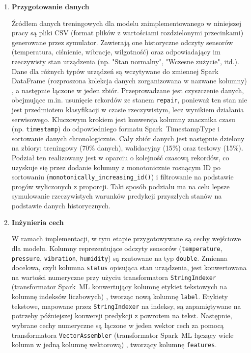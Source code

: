 \begin{enumerate}

    \item \textbf{Przygotowanie danych}

Źródłem danych treningowych dla modelu zaimplementowanego w niniejszej pracy są pliki CSV (format plików z wartościami rozdzielonymi przecinkami) \cite{csv_rfc} generowane przez symulator. Zawierają one historyczne odczyty sensorów (temperatura, ciśnienie, wibracje, wilgotność) oraz odpowiadający im rzeczywisty stan urządzenia (np. "Stan normalny", "Wczesne zużycie", itd.). Dane dla różnych typów urządzeń są wczytywane do zmiennej Spark DataFrame (rozproszona kolekcja danych zorganizowana w nazwane kolumny) \cite{chambers2018spark} , a następnie łączone w jeden zbiór. Przeprowadzane jest czyszczenie danych, obejmujące m.in. usunięcie rekordów ze stanem \texttt{repair}, ponieważ ten stan nie jest przedmiotem klasyfikacji w czasie rzeczywistym, lecz wynikiem działania serwisowego. Kluczowym krokiem jest konwersja kolumny znacznika czasu (np. \texttt{timestamp}) do odpowiedniego formatu \mbox{Spark TimestampType} i sortowanie danych chronologicznie. Cały zbiór danych jest następnie dzielony na zbiory: treningowy (70\% danych), walidacyjny (15\%) oraz testowy (15\%). Podział ten realizowany jest w oparciu o kolejność czasową rekordów, co uzyskuje się przez dodanie kolumny z monotonicznie rosnącym ID po sortowaniu (\texttt{monotonically\_increasing\_id()}) i filtrowanie na podstawie progów wyliczonych z proporcji. Taki sposób podziału ma na celu lepsze symulowanie rzeczywistych warunków predykcji przyszłych stanów na podstawie danych historycznych.

 \item \textbf{Inżynieria cech}

W ramach implementacji, w tym etapie przygotowywane są cechy wejściowe dla modelu. Kolumny reprezentujące odczyty sensorów (\texttt{temperature}, \texttt{pressure}, \texttt{vibration}, \texttt{humidity}) są rzutowane na typ \texttt{double}. Zmienna docelowa, czyli kolumna \texttt{status} opisująca stan urządzenia, jest konwertowana na wartości numeryczne przy użyciu transformatora \texttt{StringIndexer} (transformator \mbox{Spark ML} konwertujący kolumnę etykiet tekstowych na kolumnę indeksów liczbowych) \cite{spark_mllib_reference}, tworząc nową kolumnę \texttt{label}. Etykiety tekstowe, mapowane przez \texttt{StringIndexer} na indeksy, są zapamiętywane na potrzeby późniejszej konwersji predykcji z powrotem na tekst. Następnie, wybrane cechy numeryczne są łączone w jeden wektor cech za pomocą transformatora \texttt{VectorAssembler} (transformator \mbox{Spark ML} łączący wiele kolumn w jedną kolumnę wektorową) \cite{spark_mllib_reference} , tworzący kolumnę \texttt{features}.


\end{enumerate}

